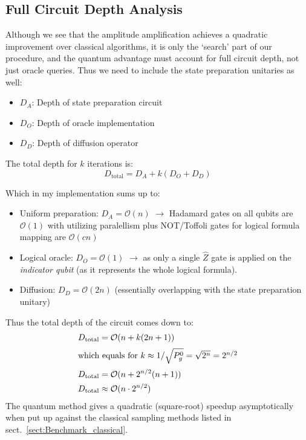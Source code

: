 \documentclass[encoding=utf8,british]{tumphthesis}
\begin{document}
        \subsection{Full Circuit Depth Analysis}
        Although we see that the amplitude amplification achieves a quadratic improvement over classical algorithms, it is only the
        `search' part of our procedure, and the quantum advantage must account for full circuit depth, not just oracle queries. 
        Thus we need to include the state preparation unitaries as well:
        \begin{itemize}
            \item $D_A$: Depth of state preparation circuit
            \item $D_O$: Depth of oracle implementation
            \item $D_D$: Depth of diffusion operator
        \end{itemize}
        The total depth for $k$ iterations is:
        \begin{equation}
        D_{\text{total}} = D_A + k(D_O + D_D)
        \end{equation}

        Which in my implementation sums up to:
        \begin{itemize}
            \item Uniform preparation: $D_A = \mathcal{O}(n)$ $\rightarrow$ Hadamard gates on all qubits are $\mathcal{O}(1)$ with utilizing paralellism
            plus NOT/Toffoli gates for logical formula mapping are $\mathcal{O}(cn)$
            \item Logical oracle: $D_O = \mathcal{O}(1)$ $\rightarrow$ as only a single $\hat{Z}$ gate is applied on the \textit{indicator qubit} 
            (as it represents the whole logical formula).
            \item Diffusion: $D_D = \mathcal{O}(2n)$ (essentially overlapping with the state preparation unitary)
        \end{itemize}

        Thus the total depth of the circuit comes down to:
        \begin{align*}
            D_{\text{total}} &= \mathcal{O}(n + k(2n+1)) \\
            \intertext{which equals for $k \approx 1/\sqrt{P_g^0} = \sqrt{2^n} = 2^{n/2}$}
            D_{\text{total}} &= \mathcal{O}(n + 2^{n/2}(n+1)) \\
            D_{\text{total}} &\approx \mathcal{O}(n \cdot 2^{n/2})
        \end{align*} 
        The quantum method gives a quadratic (square-root) speedup asymptotically when put up against the classical sampling methods listed in sect.~\ref{sect:Benchmark_classical}.
\end{document}
